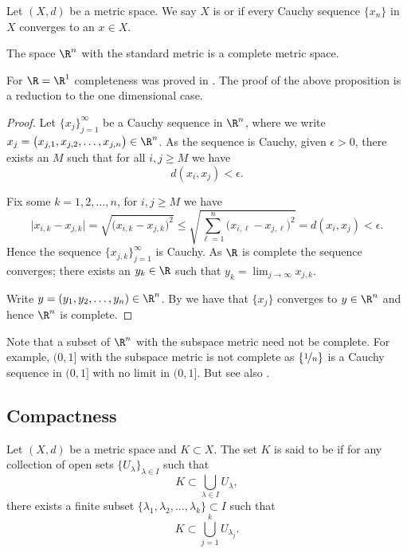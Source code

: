 \documentclass[12pt]{book}
\begin{document}
\begin{defn}
Let $(X,d)$ be a metric space.
We say $X$ is
\emph{} or \emph{}
if every Cauchy sequence $\{ x_n \}$ in $X$
converges to an $x \in X$.
\end{defn}

\begin{prop}
The space $\R^n$ with the standard metric is a complete metric space.
\end{prop}

For $\R = \R^1$ completeness was proved in .
The proof of
the above proposition is a reduction to the one dimensional case.

\begin{proof}
Let $\{ x_j \}_{j=1}^\infty$ be a Cauchy sequence
in $\R^n$, where we write $x_j = \bigl(x_{j,1},x_{j,2},\ldots,x_{j,n}\bigr) \in \R^n$.
As the sequence is Cauchy, given $\epsilon > 0$, there exists an $M$ such that for all
$i,j \geq M$ we have
\begin{equation*}
d(x_i,x_j) < \epsilon.
\end{equation*}

Fix some $k=1,2,\ldots,n$, for $i,j \geq M$ we have
\begin{equation*}
\bigl\lvert x_{i,k} - x_{j,k} \bigr\rvert
=
\sqrt{{\bigl(x_{i,k} - x_{j,k}\bigr)}^2}
\leq
\sqrt{\sum_{\ell=1}^n {\bigl(x_{i,\ell}-x_{j,\ell}\bigr)}^2}
= d(x_i,x_j) < \epsilon .
\end{equation*}
Hence the sequence $\{ x_{j,k} \}_{j=1}^\infty$ is Cauchy.
As $\R$ is
complete the sequence converges; there exists an $y_k \in \R$ such that
$y_k = \lim_{j\to\infty} x_{j,k}$.

Write $y = (y_1,y_2,\ldots,y_n) \in \R^n$.
By  we have that $\{ x_j \}$ converges
to $y \in \R^n$ and hence $\R^n$ is complete.
\end{proof}

Note that a subset of $\R^n$ with the subspace metric need not be
complete.
For example, $(0,1]$ with the subspace metric is not
complete as $\{ \nicefrac{1}{n} \}$ is a Cauchy sequence in $(0,1]$
with no limit in $(0,1]$.
But see also
.

\subsection*{Compactness}

\begin{defn}
Let $(X,d)$ be a metric space and $K \subset X$. 
The set $K$ is said to be \emph{}
if for any collection
of open sets $\{ U_{\lambda} \}_{\lambda \in I}$ such that
\begin{equation*}
K \subset \bigcup_{\lambda \in I} U_\lambda ,
\end{equation*}
there exists a finite subset
$\{ \lambda_1, \lambda_2,\ldots,\lambda_k \} \subset I$
such that
\begin{equation*}
K \subset \bigcup_{j=1}^k U_{\lambda_j} .
\end{equation*}
\end{defn}
\end{document}
